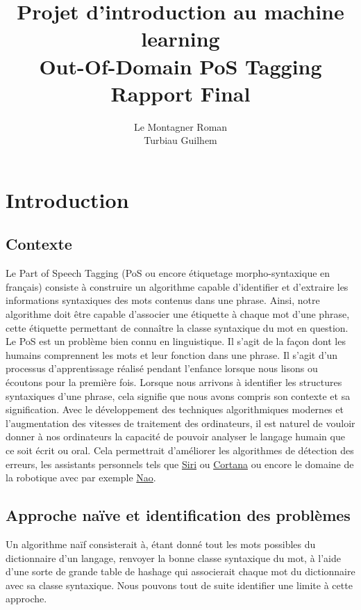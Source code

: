 \documentclass[french, 14pt]{memoir}
\title{\textbf{Projet d'introduction au machine learning\\
Out-Of-Domain PoS Tagging
\\Rapport Final}}
\author{Le Montagner Roman\\
		Turbiau Guilhem\\}
\date{}
\begin{document}
\maketitle

\tableofcontents

\chapter{Introduction}
\section{Contexte}
Le Part of Speech Tagging (PoS ou encore étiquetage morpho-syntaxique en français) consiste à construire un algorithme capable d'identifier et d'extraire les informations syntaxiques des mots contenus dans une phrase. Ainsi, notre algorithme doit être capable d'associer une étiquette à chaque mot d'une phrase, cette étiquette permettant de connaître la classe syntaxique du mot en question.\\
Le PoS est un problème bien connu en linguistique. Il s'agit de la façon dont les humains comprennent les mots et leur fonction dans une phrase. Il s'agit d'un processus d'apprentissage réalisé pendant l'enfance lorsque nous lisons ou écoutons pour la première fois. Lorsque nous arrivons à identifier les structures syntaxiques d'une phrase, cela signifie que nous avons compris son contexte et sa signification. Avec le développement des techniques algorithmiques modernes et l'augmentation des vitesses de traitement des ordinateurs, il est naturel de vouloir donner à nos ordinateurs la capacité de pouvoir analyser le langage humain que ce soit écrit ou oral. Cela permettrait d'améliorer les algorithmes de détection des erreurs, les assistants personnels tels que \href{https://www.apple.com/fr/siri/}{Siri} ou \href{https://www.microsoft.com/en-us/cortana}{Cortana} ou encore le domaine de la robotique avec par exemple \href{https://www.softbankrobotics.com/emea/fr/nao}{Nao}.

\section{Approche naïve et identification des problèmes}

Un algorithme naïf consisterait à, étant donné tout les mots possibles du dictionnaire d'un langage, renvoyer la bonne classe syntaxique du mot, à l'aide d'une sorte de grande table de hashage qui associerait chaque mot du dictionnaire avec sa classe syntaxique. Nous pouvons tout de suite identifier une limite à cette approche.
\end{document}
